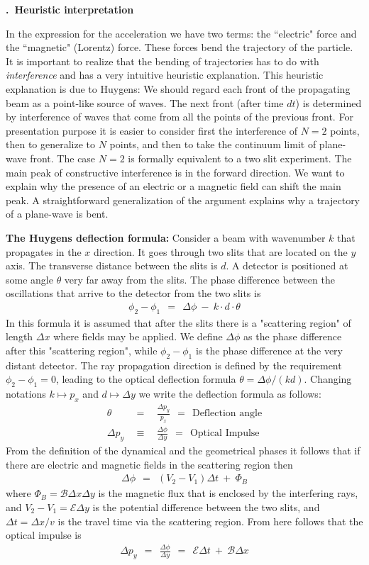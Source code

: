 \documentclass[onecolumn,fleqn, 11pt]{revtex4}
\newcommand{\beq}{\begin{eqnarray}}
\newcommand{\eeq}{\end{eqnarray}}
\renewcommand{\thesubsection}{\arabic{subsection}}
\renewcommand{\thesubsubsection}{\arabic{subsubsection}}
\newcommand{\sheadC}[1]
{
\addtocounter{subsubsection}{1}
\vspace{5mm}
{\bf \thesubsection.\thesubsubsection \ #1}  
\nopagebreak
\phantomsection
}
\begin{document}
 
\sheadC{Heuristic interpretation}

In the expression for the acceleration we have two terms: 
the ``electric" force and the ``magnetic" (Lorentz) force.
These forces bend the trajectory of the particle.   
It is important to realize that the bending of trajectories 
has to do with {\em interference} and has a very intuitive 
heuristic explanation. This heuristic explanation is due to 
Huygens: We should regard each front of the propagating 
beam as a point-like source of waves. The next front (after time $dt$) 
is determined by interference of waves that come from all 
the points of the previous front. For presentation purpose 
it is easier to consider first the interference of $N=2$ points, 
then to generalize to $N$ points, and then to take 
the continuum limit of plane-wave front. 
The case $N=2$ is formally equivalent to a two slit experiment. 
The main peak of constructive interference is in the 
forward direction. We want to explain why the presence of 
an electric or a magnetic field can shift the main peak. 
A straightforward generalization of the argument explains 
why a trajectory of a plane-wave is bent. 


{\bf The Huygens deflection formula:}
Consider a beam with wavenumber $k$ that propagates in the $x$ direction.
It goes through two slits that are located on the $y$ axis. 
The transverse distance between the slits is ${d}$. 
A detector is positioned at some angle $\theta$ very far away from the slits.
The phase difference between the oscillations 
that arrive to the detector from the two slits is  
\beq
\phi_2-\phi_1 \ \ = \ \ \Delta \phi \ - \ k \cdot d \cdot \theta 
\eeq
In this formula it is assumed that after the slits there 
is a "scattering region" of length $\Delta x$ where fields 
may be applied. We define $\Delta \phi$ as the phase difference 
after this "scattering region", while  ${\phi_2-\phi_1}$ is the 
phase difference at the very distant detector.   
The ray propagation direction is defined by the requirement ${\phi_2-\phi_1=0}$, 
leading to the optical deflection formula $\theta=\Delta \phi/(kd)$. 
Changing notations ${k\mapsto p_x}$ and ${d\mapsto \Delta y}$ 
we write the deflection formula as follows:   
\beq
\theta \ \ &=& \ \ \frac{\Delta p_y}{p_x} \ \ = \ \ \mbox{Deflection angle}
\\
\Delta p_y \ \ &\equiv& \ \ \frac{\Delta \phi}{\Delta y} \ \ = \ \ \mbox{Optical Impulse} 
\eeq
From the definition of the dynamical and the geometrical phases 
it follows that if there are electric and magnetic fields in the 
scattering region then   
\beq
\Delta \phi \ \ = \ \ (V_2-V_1) \Delta t \ + \ \Phi_B
\eeq
where $\Phi_B = \mathcal{B}\Delta x\Delta y $ is the magnetic flux
that is enclosed by the interfering rays, 
and $V_2-V_1=\mathcal{E} \Delta y$ is the potential difference between the two slits, 
and $\Delta t = \Delta x / v$ is the travel time via the scattering region. 
From here follows that the optical impulse is 
\beq
\Delta p_y 
\ \ = \ \ \frac{\Delta \phi}{\Delta y}
\ \ = \ \ \mathcal{E} \Delta t \ + \ \mathcal{B}  \Delta x 
\eeq
\end{document}
